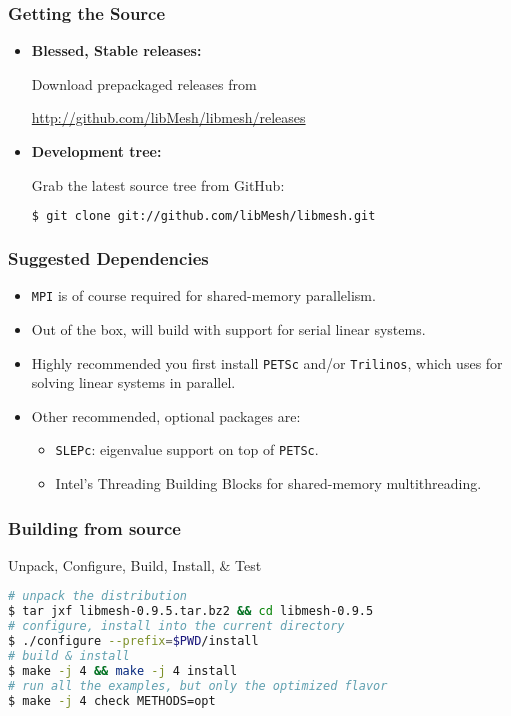 \begin{frame}[fragile]
  \frametitle{Getting the \libMesh{} Source}

  \begin{block}{}
    \begin{itemize}
    \item \textbf{Blessed, Stable releases:}

      Download prepackaged releases from

      \scriptsize{\url{http://github.com/libMesh/libmesh/releases}}
      \normalsize
    \item \textbf{Development tree:}

      Grab the latest source tree from GitHub:
      \begin{lstlisting}[language=bash]
$ git clone git://github.com/libMesh/libmesh.git
      \end{lstlisting}
    \end{itemize}
  \end{block}
\end{frame}

\begin{frame}
  \frametitle{\libMesh{} Suggested Dependencies}
  \begin{itemize}
    \item  \texttt{MPI} is of course required for shared-memory parallelism.
    \item Out of the box, \libMesh{} will build with support for serial linear systems.
    \item Highly recommended you first install \texttt{PETSc} and/or \texttt{Trilinos}, which \libMesh{} uses for solving linear systems in parallel.
      \item Other recommended, optional packages are:
        \begin{itemize}
          \item \texttt{SLEPc}: eigenvalue support on top of \texttt{PETSc}.
          \item Intel's Threading Building Blocks for shared-memory multithreading.
        \end{itemize}
  \end{itemize}
\end{frame}

\begin{frame}[fragile]
  \frametitle{Building \libMesh{} from source}

  \begin{block}{Unpack, Configure, Build, Install, \& Test}
    \begin{lstlisting}[language=bash]
# unpack the distribution
$ tar jxf libmesh-0.9.5.tar.bz2 && cd libmesh-0.9.5
# configure, install into the current directory
$ ./configure --prefix=$PWD/install
# build & install
$ make -j 4 && make -j 4 install
# run all the examples, but only the optimized flavor
$ make -j 4 check METHODS=opt
    \end{lstlisting}
  \end{block}
\end{frame}



